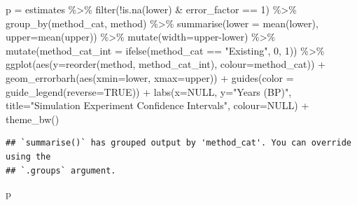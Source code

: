 \documentclass[
]{article}
\newenvironment{Shaded}{\begin{snugshade}}{\end{snugshade}}
\newcommand{\AttributeTok}[1]{\textcolor[rgb]{0.77,0.63,0.00}{#1}}
\newcommand{\ConstantTok}[1]{\textcolor[rgb]{0.00,0.00,0.00}{#1}}
\newcommand{\DecValTok}[1]{\textcolor[rgb]{0.00,0.00,0.81}{#1}}
\newcommand{\FunctionTok}[1]{\textcolor[rgb]{0.00,0.00,0.00}{#1}}
\newcommand{\NormalTok}[1]{#1}
\newcommand{\OtherTok}[1]{\textcolor[rgb]{0.56,0.35,0.01}{#1}}
\newcommand{\SpecialCharTok}[1]{\textcolor[rgb]{0.00,0.00,0.00}{#1}}
\newcommand{\StringTok}[1]{\textcolor[rgb]{0.31,0.60,0.02}{#1}}
\begin{document}
\begin{Shaded}
\begin{Highlighting}[]
\NormalTok{p }\OtherTok{=}\NormalTok{ estimates }\SpecialCharTok{\%\textgreater{}\%}
  \FunctionTok{filter}\NormalTok{(}\SpecialCharTok{!}\FunctionTok{is.na}\NormalTok{(lower) }\SpecialCharTok{\&}\NormalTok{ error\_factor }\SpecialCharTok{==} \DecValTok{1}\NormalTok{) }\SpecialCharTok{\%\textgreater{}\%}
  \FunctionTok{group\_by}\NormalTok{(method\_cat, method) }\SpecialCharTok{\%\textgreater{}\%}
  \FunctionTok{summarise}\NormalTok{(}\AttributeTok{lower =} \FunctionTok{mean}\NormalTok{(lower), }\AttributeTok{upper=}\FunctionTok{mean}\NormalTok{(upper)) }\SpecialCharTok{\%\textgreater{}\%}
  \FunctionTok{mutate}\NormalTok{(}\AttributeTok{width=}\NormalTok{upper}\SpecialCharTok{{-}}\NormalTok{lower) }\SpecialCharTok{\%\textgreater{}\%}
  \FunctionTok{mutate}\NormalTok{(}\AttributeTok{method\_cat\_int =} \FunctionTok{ifelse}\NormalTok{(method\_cat }\SpecialCharTok{==} \StringTok{"Existing"}\NormalTok{, }\DecValTok{0}\NormalTok{, }\DecValTok{1}\NormalTok{)) }\SpecialCharTok{\%\textgreater{}\%}
  \FunctionTok{ggplot}\NormalTok{(}\FunctionTok{aes}\NormalTok{(}\AttributeTok{y=}\FunctionTok{reorder}\NormalTok{(method, method\_cat\_int), }\AttributeTok{colour=}\NormalTok{method\_cat)) }\SpecialCharTok{+}
  \FunctionTok{geom\_errorbarh}\NormalTok{(}\FunctionTok{aes}\NormalTok{(}\AttributeTok{xmin=}\NormalTok{lower, }\AttributeTok{xmax=}\NormalTok{upper)) }\SpecialCharTok{+}
  \FunctionTok{guides}\NormalTok{(}\AttributeTok{color =} \FunctionTok{guide\_legend}\NormalTok{(}\AttributeTok{reverse=}\ConstantTok{TRUE}\NormalTok{)) }\SpecialCharTok{+}
  \FunctionTok{labs}\NormalTok{(}\AttributeTok{x=}\ConstantTok{NULL}\NormalTok{, }\AttributeTok{y=}\StringTok{"Years (BP)"}\NormalTok{, }\AttributeTok{title=}\StringTok{"Simulation Experiment Confidence Intervals"}\NormalTok{, }\AttributeTok{colour=}\ConstantTok{NULL}\NormalTok{) }\SpecialCharTok{+}
  \FunctionTok{theme\_bw}\NormalTok{()}
\end{Highlighting}
\end{Shaded}

\begin{verbatim}
## `summarise()` has grouped output by 'method_cat'. You can override using the
## `.groups` argument.
\end{verbatim}

\begin{Shaded}
\begin{Highlighting}[]
\NormalTok{p}
\end{Highlighting}
\end{Shaded}
\end{document}
